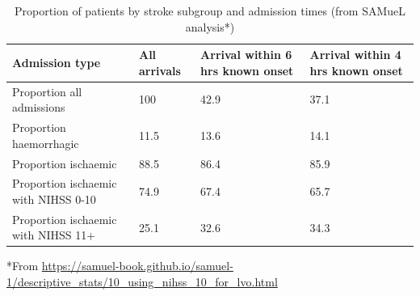 \begin{minipage}{1.0\textwidth}
\begin{longtable}[]{p{6.3cm} | p{2.5cm} p{2.5cm} p{2.5cm}}
\caption{Proportion of patients by stroke subgroup and admission times (from SAMueL analysis*)}\label{tab_stroke_type}\\
\toprule
Admission type & All arrivals & Arrival within 6 hrs known onset &
Arrival within 4 hrs known onset \\
\midrule
\endhead
Proportion all admissions & 100 & 42.9 & 37.1 \\
Proportion haemorrhagic & 11.5 & 13.6 & 14.1 \\
Proportion ischaemic & 88.5 & 86.4 & 85.9 \\
Proportion ischaemic with NIHSS 0-10 & 74.9 & 67.4 & 65.7 \\
Proportion ischaemic with NIHSS 11+ & 25.1 & 32.6 & 34.3 \\
\end{longtable}
\footnotesize{*From \url{https://samuel-book.github.io/samuel-1/descriptive_stats/10_using_nihss_10_for_lvo.html}}
 
\end{minipage}
